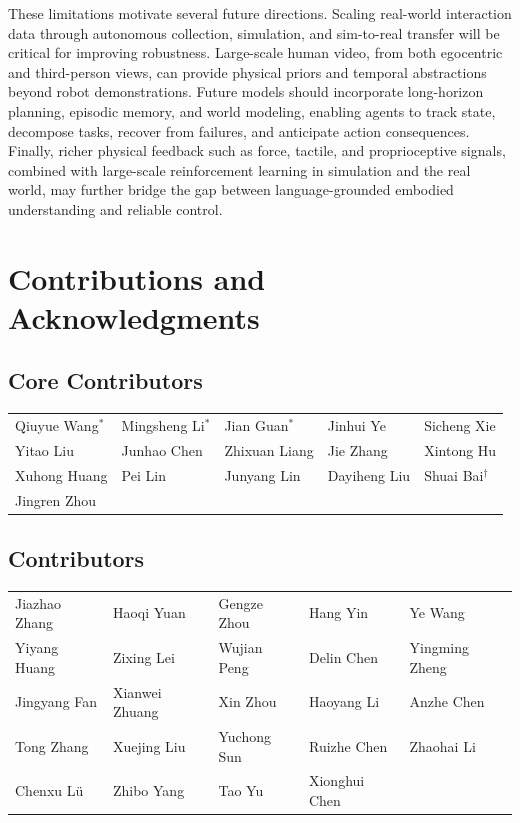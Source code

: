\documentclass{llmxive}
\begin{document}
These limitations motivate several future directions. Scaling real-world interaction data through autonomous collection, simulation, and sim-to-real transfer will be critical for improving robustness. Large-scale human video, from both egocentric and third-person views, can provide physical priors and temporal abstractions beyond robot demonstrations. Future models should incorporate long-horizon planning, episodic memory, and world modeling, enabling agents to track state, decompose tasks, recover from failures, and anticipate action consequences. Finally, richer physical feedback such as force, tactile, and proprioceptive signals, combined with large-scale reinforcement learning in simulation and the real world, may further bridge the gap between language-grounded embodied understanding and reliable control.


\section{Contributions and Acknowledgments}


\subsection*{Core Contributors}

\noindent
\begin{tabularx}{\textwidth}{@{}LLLLL@{}}
Qiuyue Wang$^{*}$ & Mingsheng Li$^{*}$ & Jian Guan$^{*}$ & Jinhui Ye & Sicheng Xie \\
Yitao Liu & Junhao Chen & Zhixuan Liang & Jie Zhang & Xintong Hu \\
Xuhong Huang & Pei Lin & Junyang Lin & Dayiheng Liu & Shuai Bai$^{\dagger}$ \\
Jingren Zhou & & & & \\
\end{tabularx}


\vspace{1.2em}

\subsection*{Contributors}

\noindent
\begin{tabularx}{\textwidth}{@{}LLLLL@{}}
Jiazhao Zhang & Haoqi Yuan & Gengze Zhou & Hang Yin & Ye Wang \\
Yiyang Huang & Zixing Lei & Wujian Peng & Delin Chen & Yingming Zheng \\
Jingyang Fan & Xianwei Zhuang & Xin Zhou & Haoyang Li & Anzhe Chen \\
Tong Zhang & Xuejing Liu & Yuchong Sun & Ruizhe Chen & Zhaohai Li \\
Chenxu L\"u & Zhibo Yang & Tao Yu & Xionghui Chen & \\
\end{tabularx}
\end{document}
